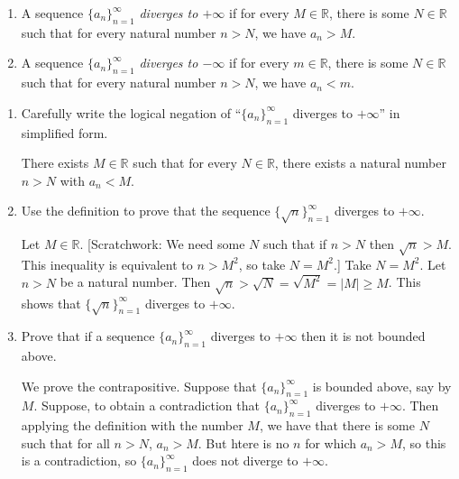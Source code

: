 \documentclass[12pt]{amsart}
\newcommand{\R}{{\mathbb{R}}}
\numberwithin{equation}{section}
\theoremstyle{plain} %
\theoremstyle{definition}
\theoremstyle{remark}
\begin{document}
\begin{framed}
\begin{enumerate}[label=(\Roman*)]
\item A sequence $\{a_n\}_{n=1}^\infty$ \emph{diverges to $+\infty$} if for every $M\in \R$, there is some $N\in \R$ such that for every natural number $n>N$, we have $a_n >M$.
\item A sequence $\{a_n\}_{n=1}^\infty$ \emph{diverges to $-\infty$} if for every $m\in \R$, there is some $N\in \R$ such that for every natural number $n>N$, we have $a_n < m$.
\end{enumerate} 
\end{framed}



\begin{enumerate}

\item Carefully write the logical negation of ``$\{ a_n\}_{n=1}^\infty$ diverges to $+\infty$'' in simplified form.

\begin{framed}
There exists $M\in \R$ such that for every $N\in \R$, there exists a natural number $n>N$ with $a_n <M$.
\end{framed}

\item Use the definition to prove that the sequence $\{ \sqrt{n} \}_{n=1}^\infty$ diverges to $+\infty$.

\begin{framed}
Let $M\in \R$. [Scratchwork: We need some $N$ such that if $n>N$ then $\sqrt{n} > M$. This inequality is equivalent to $n > M^2$, so take $N=M^2$.]
Take $N=M^2$. Let $n>N$ be a natural number. Then $\sqrt{n} > \sqrt{N} = \sqrt{M^2} = |M| \geq M$. This shows that $\{ \sqrt{n} \}_{n=1}^\infty$ diverges to $+\infty$.
\end{framed}



\item\label{nba} Prove that if a sequence $\{ a_n\}_{n=1}^\infty$ diverges to $+\infty$ then it is not bounded above. 


\begin{framed} We prove the contrapositive. Suppose that $\{ a_n\}_{n=1}^\infty$ is bounded above, say by $M$. Suppose, to obtain a contradiction that $\{ a_n\}_{n=1}^\infty$ diverges to $+\infty$. Then applying the definition with the number $M$, we have that there is some $N$ such that for all $n>N$, $a_n>M$. But htere is no $n$ for which $a_n>M$, so this is a contradiction, so $\{ a_n\}_{n=1}^\infty$ does not diverge to $+\infty$.
\end{framed}


\end{enumerate}
\end{document}
